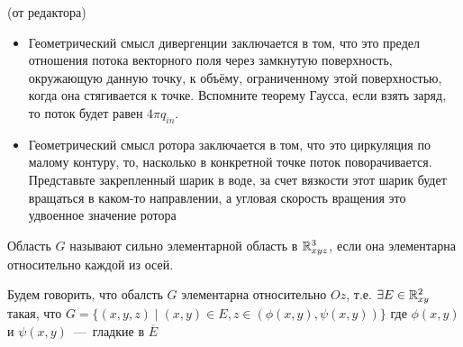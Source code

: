 \begin{note}(от редактора)
\begin{itemize}
    \item Геометрический смысл дивергенции заключается в том, что это предел отношения потока векторного поля через замкнутую поверхность, окружающую данную точку, к объёму, ограниченному этой поверхностью, когда она стягивается к точке. Вспомните теорему Гаусса, если взять заряд, то поток будет равен $4 \pi q_{in}$.
    \item Геометрический смысл ротора заключается в том, что это циркуляция по малому контуру, то, насколько в конкретной точке поток поворачивается. Представьте закрепленный шарик в воде, за счет вязкости этот шарик будет вращаться в каком-то направлении, а угловая скорость вращения это удвоенное значение ротора
\end{itemize}



\end{note}
\begin{definition}
    Область $G$ называют сильно элементарной область в $\mathbb{R}^3_{xyz}$, если она элементарна относительно каждой из осей.
\end{definition}
\begin{definition}
    Будем говорить, что обалсть $G$ элементарна относительно $Oz$, т.е. $\exists E \in \mathbb{R}^2_{xy}$ такая, что $G = \{(x, y, z) \mid (x, y) \in E, z \in (\phi(x, y), \psi(x, y))\}$ где $\phi(x, y)$ и $\psi(x, y)$~---~гладкие в $\overline{E}$
\end{definition}

